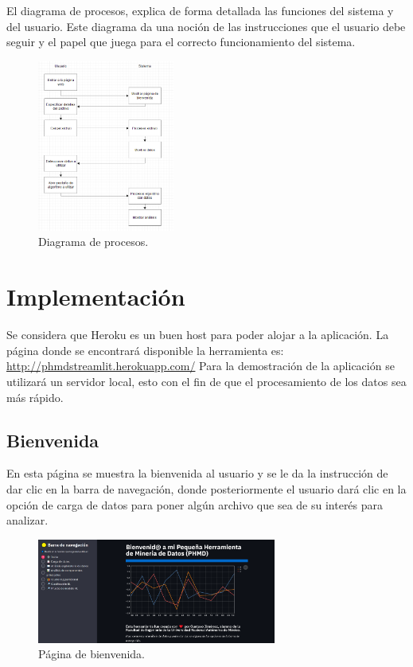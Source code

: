 \documentclass{article}
\begin{document}
El diagrama de procesos, explica de forma detallada las funciones del sistema y del usuario. Este diagrama da una noción de las instrucciones
que el usuario debe seguir y el papel que juega para el correcto funcionamiento del sistema.
\begin{figure}[!htb]
	\centering
	\includegraphics[width=0.4\textwidth]{figures/DDP.png}
	\caption{Diagrama de procesos.}
	\label{fig:diagramaDeProcesos}
\end{figure}

\section{Implementación}
Se considera que Heroku es un buen host para poder alojar a la aplicación. La página donde se encontrará disponible la herramienta es:
\url{http://phmdstreamlit.herokuapp.com/} Para la demostración de la aplicación se utilizará un servidor local, esto con el fin de que 
el procesamiento de los datos sea más rápido.

\subsection{Bienvenida}

En esta página se muestra la bienvenida al usuario y se le da la instrucción de dar clic en la barra de navegación, donde posteriormente el usuario dará
clic en la opción de carga de datos para poner algún archivo que sea de su interés para analizar.
\begin{figure}[!htb]
	\centering
	\includegraphics[width=0.7\textwidth]{figures/pagina-inicio.png}
	\caption{Página de bienvenida.}
	\label{fig:pagina-inicio}
\end{figure}
\end{document}
